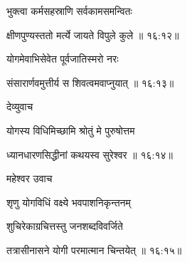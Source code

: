 {\devanagarifont भुक्त्वा कर्मसहस्राणि सर्वकामसमन्वितः \thinspace{\dandab} \dontdisplaylinenum }%
 

{\devanagarifont क्षीणपुण्यस्ततो मर्त्ये जायते विपुले कुले {॥ १६:१२॥} \veg\dontdisplaylinenum }%

{\devanagarifont योगमेवाभिसेवेत पूर्वजातिस्मरो नरः \thinspace{\dandab} \dontdisplaylinenum }%
 

{\devanagarifont संसारार्णवमुत्तीर्य स शिवत्वमवाप्नुयात् {॥ १६:१३॥} \veg\dontdisplaylinenum }%
 

{\devanagarifont देव्युवाच {\dandab}\dontdisplaylinenum  }%
 
{\devanagarifont योगस्य विधिमिच्छामि श्रोतुं मे पुरुषोत्तम \thinspace{\danda} \dontdisplaylinenum }%


{\devanagarifont ध्यानधारणसिद्धीनां कथयस्व सुरेश्वर {॥ १६:१४॥} \veg\dontdisplaylinenum }%

{\devanagarifont महेश्वर उवाच {\dandab}\dontdisplaylinenum  }%

{\devanagarifont शृणु योगविधिं वक्ष्ये भवपाशनिकृन्तनम् \thinspace{\danda} \dontdisplaylinenum }%
 
{\devanagarifont शुचिरेकाग्रचित्तस्तु जनशब्दविवर्जिते  \danda\dontdisplaylinenum }%


{\devanagarifont तत्रासीनासने योगी परमात्मान चिन्तयेत् {॥ १६:१५॥} \veg\dontdisplaylinenum }%

